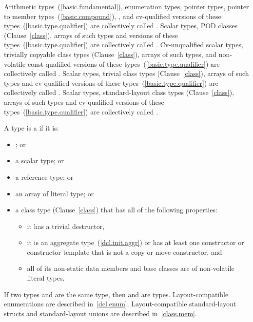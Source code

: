 \pnum
Arithmetic types~(\ref{basic.fundamental}), enumeration types, pointer
types, pointer to member types~(\ref{basic.compound}),
,
and
cv-qualified versions of these
types~(\ref{basic.type.qualifier}) are collectively called
%
. Scalar types,
POD classes (Clause~\ref{class}), arrays of such types and
 versions of these
types~(\ref{basic.type.qualifier}) are collectively called
%
.
Cv-unqualified scalar types, trivially copyable class types (Clause~\ref{class}), arrays of
such types, and non-volatile const-qualified versions of these
types~(\ref{basic.type.qualifier}) are collectively called .
Scalar types, trivial class types (Clause~\ref{class}),
arrays of such types and cv-qualified versions of these
types~(\ref{basic.type.qualifier}) are collectively called
. Scalar types, standard-layout class
types (Clause~\ref{class}), arrays of such types and
cv-qualified versions of these types~(\ref{basic.type.qualifier})
are collectively called .

\pnum
A type is a  if it is:

\begin{itemize}
\item {}; or
\item a scalar type; or
\item a reference type; or
\item an array of literal type; or
\item a class type (Clause~\ref{class}) that
has all of the following properties:
\begin{itemize}
\item it has a trivial destructor,
\item it is an aggregate type~(\ref{dcl.init.aggr}) or has
at least one  constructor or constructor template that is not a copy or move constructor, and
\item all of its non-static data members and base classes are
of non-volatile literal types.
\end{itemize}
\end{itemize}

\pnum
If two types  and  are the same type, then
 and  are  types.
\enternote Layout-compatible enumerations are described
in~\ref{dcl.enum}. Layout-compatible standard-layout
structs and standard-layout unions are
described in~\ref{class.mem}. \exitnote

